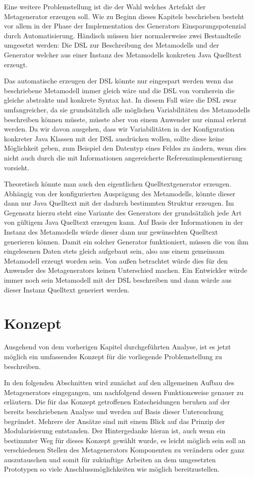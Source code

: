 \documentclass[12pt,oneside,a4paper,parskip]{scrbook}
\begin{document}
Eine weitere Problemstellung ist die der Wahl welches Artefakt der Metagenerator erzeugen soll. Wie zu Beginn dieses Kapitels beschrieben besteht vor allem in der Phase der Implementation des Generators Einsparungspotenzial durch Automatisierung. Händisch müssen hier normalerweise zwei Bestandteile umgesetzt werden: Die DSL zur Beschreibung des Metamodells und der Generator welcher aus einer Instanz des Metamodells konkreten Java Quelltext erzeugt. 

Das automatische erzeugen der DSL könnte nur eingespart werden wenn das beschriebene Metamodell immer gleich wäre und die DSL von vornherein die gleiche abstrakte und konkrete Syntax hat. In diesem Fall wäre die DSL zwar umfangreicher, da sie grundsätzlich alle möglichen Variabilitäten des Metamodells beschreiben können müsste, müsste aber von einem Anwender nur einmal erlernt werden. Da wir davon ausgehen, dass wir Variabilitäten in der Konfiguration konkreter Java Klassen mit der DSL ausdrücken wollen, sollte diese keine Möglichkeit geben, zum Beispiel den Datentyp eines Feldes zu ändern, wenn dies nicht auch durch die mit Informationen angereicherte Referenzimplementierung vorsieht.

Theoretisch könnte man auch den eigentlichen Quelltextgenerator erzeugen. Abhängig von der konfigurierten Ausprägung des Metamodells, könnte dieser dann nur Java Quelltext mit der dadurch bestimmten Struktur erzeugen. Im Gegensatz hierzu steht eine Variante des Generators der grundsätzlich jede Art von gültigem Java Quelltext erzeugen kann. Auf Basis der Informationen in der Instanz des Metamodells würde dieser dann nur gewünschten Quelltext generieren können. Damit ein solcher Generator funktioniert, müssen die von ihm eingelesenen Daten stets gleich aufgebaut sein, also aus einem gemeinsam Metamodell erzeugt worden sein. Von außen betrachtet würde dies für den Anwender des Metagenerators keinen Unterschied machen. Ein Entwickler würde immer noch sein Metamodell mit der DSL beschreiben und dann würde aus dieser Instanz Quelltext generiert werden.

\chapter{Konzept}

Ausgehend von dem vorherigen Kapitel durchgeführten Analyse, ist es jetzt möglich ein umfassendes Konzept für die vorliegende Problemstellung zu beschreiben.

In den folgenden Abschnitten wird zunächst auf den allgemeinen Aufbau des Metagenerators eingegangen, um nachfolgend dessen Funktionsweise genauer zu erläutern. Die für das Konzept getroffenen Entscheidungen beruhen auf der bereits beschriebenen Analyse und werden auf Basis dieser Untersuchung begründet. Mehrere der Ansätze sind mit einem Blick auf das Prinzip der Modularisierung entstanden. Der Hintergedanke hieran ist, auch wenn ein bestimmter Weg für dieses Konzept gewählt wurde, es leicht möglich sein soll an verschiedenen Stellen des Metagenerators Komponenten zu verändern oder ganz auszutauschen und somit für zukünftige Arbeiten an dem umgesetzten Prototypen so viele Anschlussmöglichkeiten wie möglich bereitzustellen.
\end{document}
